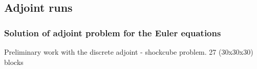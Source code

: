\documentclass{beamer}
\begin{document}
\subsection{Adjoint runs}
\begin{frame}
\frametitle{Solution of adjoint problem for the Euler equations}
\begin{minipage}[t][1\textheight]{1\textwidth}
\vspace{-20pt}
\begin{exampleblock}{Preliminary work with the discrete adjoint - shockcube problem. 27 (30x30x30) blocks}
\vspace{-20pt}
\tiny
\begin{figure}
\label{fig:Blkshockedcube}
\centering
{}

\end{figure}
\end{exampleblock}
\end{minipage}
\end{frame}
\end{document}
